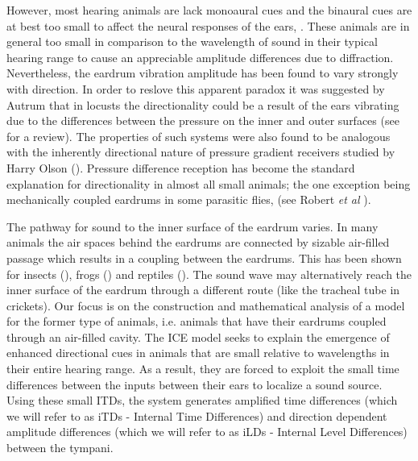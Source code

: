 However, most hearing animals are lack monoaural cues and the binaural
cues are at best too small to affect the neural responses of the ears, \cite{michelsen1}. These animals are in general too small in comparison
to the wavelength of sound in their typical hearing range to cause an appreciable amplitude differences due to diffraction. Nevertheless, 
the eardrum vibration amplitude has been found to vary strongly with direction. In order to reslove this apparent paradox it was
suggested by Autrum \cite{autrumjcomphys} that in locusts the directionality could be a result of the ears vibrating due to the
differences between the pressure on the inner and outer surfaces (see \cite{michelsenlarsen} for a review).  The properties of such systems were also found to be analogous with the inherently directional 
nature of pressure gradient receivers studied by Harry Olson (\cite{olsonmichrophones}). Pressure difference reception has
become the standard explanation for directionality in almost all small animals; the one exception being mechanically coupled
eardrums in some parasitic flies, (see Robert \emph{et al} \cite{roberthoy}).

The pathway for sound to the inner surface of the eardrum varies. In many animals the air spaces behind the eardrums are
connected by sizable air-filled passage which results in a coupling between the eardrums. This has been shown for 
insects (\cite{michelsenbiophysics}), frogs (\cite{jorgensenanurans}) and reptiles (\cite{dalsgaardmanley1}). The sound wave
may alternatively reach the inner surface of the eardrum through a different route (like the tracheal tube in crickets). Our focus
is on the construction and mathematical analysis of a model for the former type of animals, i.e. animals that have their eardrums coupled through an air-filled cavity. 
The ICE model seeks to explain the emergence of enhanced directional cues in animals that are small relative to wavelengths
in their entire hearing range. As a result, they are forced to exploit the small time differences between the inputs between
their ears to localize a sound source. Using these small ITDs, the system generates amplified
 time differences (which we will refer to as iTDs - Internal Time Differences) and direction dependent amplitude differences (which we will
 refer to as iLDs - Internal Level Differences) between the tympani.
 
